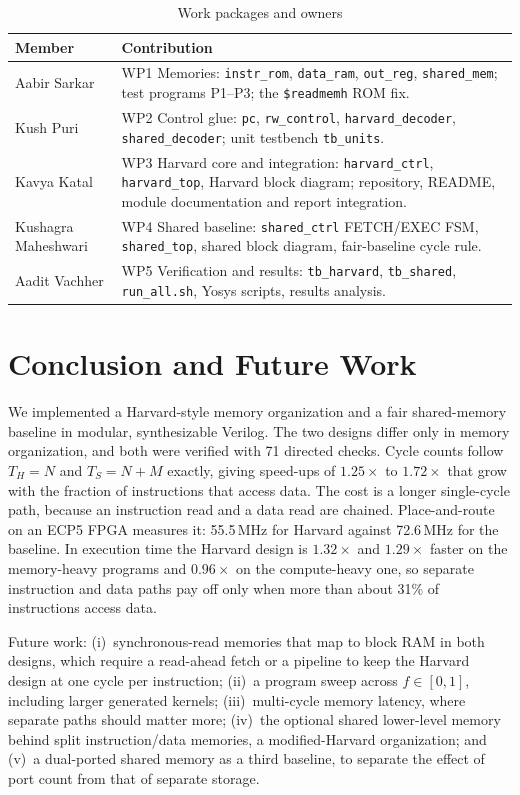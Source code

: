 \documentclass[conference]{IEEEtran}
\newcommand{\sig}[1]{\texttt{\small #1}}
\begin{document}
\begin{table}[h]
\caption{Work packages and owners}
\label{tab:contrib}
\centering
\small
\begin{tabular}{@{}p{1.85cm}p{5.85cm}@{}}
\toprule
Member & Contribution \\
\midrule
Aabir Sarkar & WP1 Memories: \sig{instr\_rom}, \sig{data\_ram}, \sig{out\_reg}, \sig{shared\_mem}; test programs P1--P3; the \sig{\$readmemh} ROM fix. \\
Kush Puri & WP2 Control glue: \sig{pc}, \sig{rw\_control}, \sig{harvard\_decoder}, \sig{shared\_decoder}; unit testbench \sig{tb\_units}. \\
Kavya Katal & WP3 Harvard core and integration: \sig{harvard\_ctrl}, \sig{harvard\_top}, Harvard block diagram; repository, README, module documentation and report integration. \\
Kushagra Maheshwari & WP4 Shared baseline: \sig{shared\_ctrl} FETCH/EXEC FSM, \sig{shared\_top}, shared block diagram, fair-baseline cycle rule. \\
Aadit Vachher & WP5 Verification and results: \sig{tb\_harvard}, \sig{tb\_shared}, \sig{run\_all.sh}, Yosys scripts, results analysis. \\
\bottomrule
\end{tabular}
\end{table}

\section{Conclusion and Future Work}
We implemented a Harvard-style memory organization and a fair shared-memory baseline in modular, synthesizable Verilog. The two designs differ only in memory organization, and both were verified with 71 directed checks. Cycle counts follow $T_H=N$ and $T_S=N+M$ exactly, giving speed-ups of $1.25\times$ to $1.72\times$ that grow with the fraction of instructions that access data. The cost is a longer single-cycle path, because an instruction read and a data read are chained. Place-and-route on an ECP5 FPGA measures it: 55.5\,MHz for Harvard against 72.6\,MHz for the baseline. In execution time the Harvard design is $1.32\times$ and $1.29\times$ faster on the memory-heavy programs and $0.96\times$ on the compute-heavy one, so separate instruction and data paths pay off only when more than about 31\% of instructions access data.

Future work: (i)~synchronous-read memories that map to block RAM in both designs, which require a read-ahead fetch or a pipeline to keep the Harvard design at one cycle per instruction; (ii)~a program sweep across $f\in[0,1]$, including larger generated kernels; (iii)~multi-cycle memory latency, where separate paths should matter more; (iv)~the optional shared lower-level memory behind split instruction/data memories, a modified-Harvard organization; and (v)~a dual-ported shared memory as a third baseline, to separate the effect of port count from that of separate storage.
\end{document}
